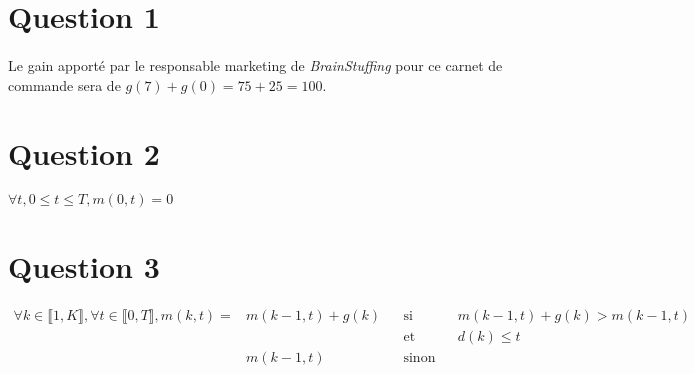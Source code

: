 \documentclass{report}
\begin{document}
\section*{Question 1}

\paragraph{} Le gain apporté par le responsable marketing de
\textit{BrainStuffing} pour ce carnet de commande sera de $g(7) + g(0) = 75 +
25 = 100$.

\section*{Question 2}

\paragraph{} $\forall t, 0 \leq t \leq T, m(0, t) = 0$

\section*{Question 3}

\paragraph{}

\begin{align*}
	\forall k \in \llbracket 1, K\rrbracket, \forall t \in \llbracket 0, T \rrbracket,
		m(k, t) = & m(k-1, t) + g(k) && \text{si}    && m(k-1,t)+g(k) > m(k-1,t)\\
		          &                  && \text{et}    && d(k) \leq t\\
		          & m(k-1, t)        && \text{sinon} &&\\
\end{align*}
\end{document}
